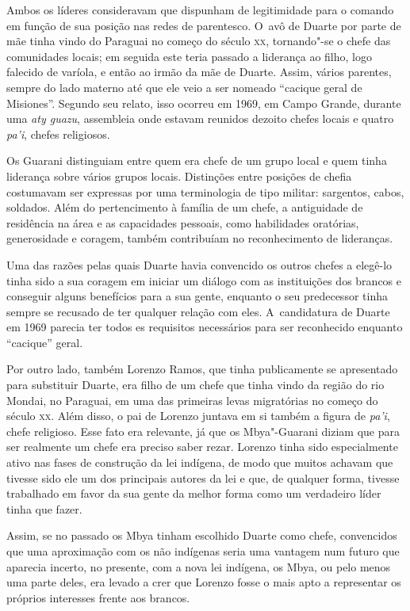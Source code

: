 Ambos os líderes consideravam que dispunham de legitimidade para o
comando em função de sua posição nas redes de parentesco. O~avô de
Duarte por parte de mãe tinha vindo do Paraguai no começo do século \textsc{xx},
tornando"-se o chefe das comunidades locais; em seguida este teria
passado a liderança ao filho, logo falecido de varíola, e então ao
irmão da mãe de Duarte. Assim, vários parentes, sempre do lado materno
até que ele veio a ser nomeado ``cacique geral de Misiones''. Segundo seu
relato, isso ocorreu em 1969, em Campo Grande, durante uma \emph{aty guazu},
assembleia onde estavam reunidos dezoito chefes locais e quatro \emph{pa’i},
chefes religiosos. 

Os Guarani distinguiam entre quem era chefe de um grupo local e quem
tinha liderança sobre vários grupos locais. Distinções entre posições
de chefia costumavam ser expressas por uma terminologia de tipo
militar: sargentos, cabos, soldados. Além do pertencimento à família de
um chefe, a antiguidade de residência na área e as capacidades
pessoais, como habilidades oratórias, generosidade e coragem, também
contribuíam no reconhecimento de lideranças. 

Uma das razões pelas quais Duarte havia convencido os outros chefes a
elegê-lo tinha sido a sua coragem em iniciar um diálogo com as
instituições dos brancos e conseguir alguns benefícios para a sua
gente, enquanto o seu predecessor tinha sempre se recusado de ter
qualquer relação com eles. A~candidatura de Duarte em 1969 parecia ter
todos es requisitos necessários para ser reconhecido enquanto ``cacique''
geral.

Por outro lado, também Lorenzo Ramos, que tinha publicamente se
apresentado para substituir Duarte, era filho de um chefe que tinha
vindo da região do rio Mondai, no Paraguai, em uma das primeiras levas
migratórias no começo do século \textsc{xx}. Além disso, o pai de Lorenzo
juntava em si também a figura de \emph{pa’i}, chefe religioso. Esse fato era
relevante, já que os Mbya"-Guarani diziam que para ser realmente um
chefe era preciso saber rezar. Lorenzo tinha sido especialmente ativo
nas fases de construção da lei indígena, de modo que muitos achavam que
tivesse sido ele um dos principais autores da lei e que, de qualquer
forma, tivesse trabalhado em favor da sua gente da melhor forma como um
verdadeiro líder tinha que fazer.

Assim, se no passado os Mbya tinham escolhido Duarte como chefe,
convencidos que uma aproximação com os não indígenas seria uma vantagem
num futuro que aparecia incerto, no presente, com a nova lei indígena,
os Mbya, ou pelo menos uma parte deles, era levado a crer que Lorenzo
fosse o mais apto a representar os próprios interesses frente aos
brancos.

